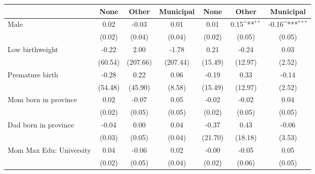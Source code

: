 {
\def\sym#1{\ifmmode^{#1}\else\(^{#1}\)\fi}
\begin{tabular}{l*{6}{c}}
\toprule
                    &\multicolumn{1}{c}{None}&\multicolumn{1}{c}{Other}&\multicolumn{1}{c}{Municipal}&\multicolumn{1}{c}{None}&\multicolumn{1}{c}{Other}&\multicolumn{1}{c}{Municipal}\\
\midrule
Male                &        0.02         &       -0.03         &        0.01         &        0.01         &        0.15\sym{**} &       -0.16\sym{***}\\
                    &      (0.02)         &      (0.04)         &      (0.04)         &      (0.02)         &      (0.05)         &      (0.05)         \\
\addlinespace
Low birthweight     &       -0.22         &        2.00         &       -1.78         &        0.21         &       -0.24         &        0.03         \\
                    &     (60.54)         &    (207.66)         &    (207.44)         &     (15.49)         &     (12.97)         &      (2.52)         \\
\addlinespace
Premature birth     &       -0.28         &        0.22         &        0.06         &       -0.19         &        0.33         &       -0.14         \\
                    &     (54.48)         &     (45.90)         &      (8.58)         &     (15.49)         &     (12.97)         &      (2.52)         \\
\addlinespace
Mom born in province&        0.02         &       -0.07         &        0.05         &       -0.02         &       -0.02         &        0.04         \\
                    &      (0.02)         &      (0.05)         &      (0.05)         &      (0.02)         &      (0.05)         &      (0.05)         \\
\addlinespace
Dad born in province&       -0.04         &        0.00         &        0.04         &       -0.37         &        0.43         &       -0.06         \\
                    &      (0.03)         &      (0.05)         &      (0.04)         &     (21.70)         &     (18.18)         &      (3.53)         \\
\addlinespace
Mom Max Edu: University&        0.04         &       -0.06         &        0.02         &       -0.00         &       -0.05         &        0.05         \\
                    &      (0.02)         &      (0.05)         &      (0.04)         &      (0.02)         &      (0.06)         &      (0.05)         \\

\end{tabular}}
